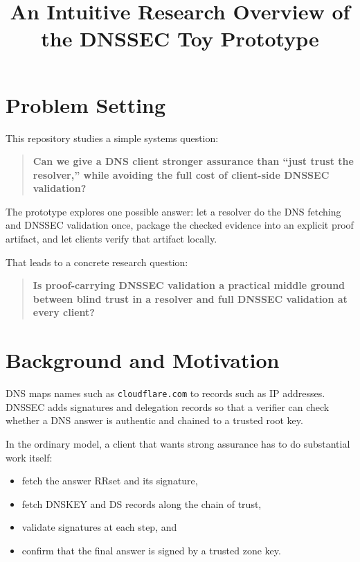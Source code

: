 \documentclass[11pt]{article}
\title{An Intuitive Research Overview of the DNSSEC Toy Prototype}
\author{}
\date{}
\begin{document}
\maketitle

\section{Problem Setting}

This repository studies a simple systems question:

\begin{quote}
\textbf{Can we give a DNS client stronger assurance than ``just trust the resolver,'' while avoiding the full cost of client-side DNSSEC validation?}
\end{quote}

The prototype explores one possible answer: let a resolver do the DNS fetching and DNSSEC validation once, package the checked evidence into an explicit proof artifact, and let clients verify that artifact locally.

That leads to a concrete research question:

\begin{quote}
\textbf{Is proof-carrying DNSSEC validation a practical middle ground between blind trust in a resolver and full DNSSEC validation at every client?}
\end{quote}

\section{Background and Motivation}

DNS maps names such as \texttt{cloudflare.com} to records such as IP addresses. DNSSEC adds signatures and delegation records so that a verifier can check whether a DNS answer is authentic and chained to a trusted root key.

In the ordinary model, a client that wants strong assurance has to do substantial work itself:

\begin{itemize}[nosep]
    \item fetch the answer RRset and its signature,
    \item fetch DNSKEY and DS records along the chain of trust,
    \item validate signatures at each step, and
    \item confirm that the final answer is signed by a trusted zone key.
\end{itemize}
\end{document}

